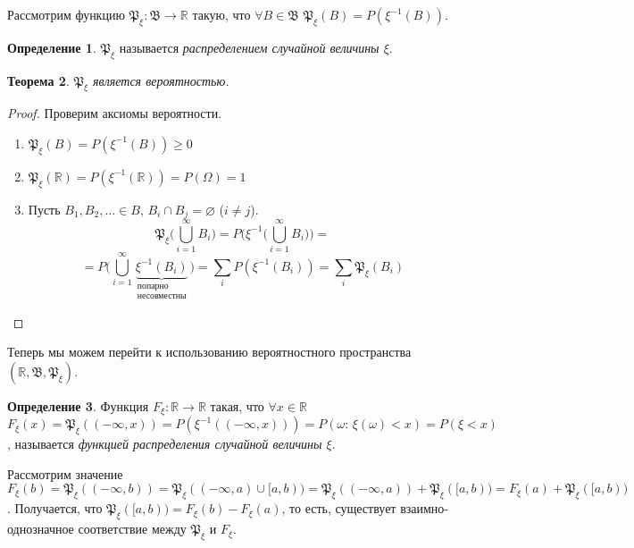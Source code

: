 \documentclass[11pt,openany,a4paper]{scrartcl}
\theoremstyle{plain}
\newtheorem{theorem}{Теорема}[subsection]
\theoremstyle{definition}
\newtheorem{definition}[theorem]{Определение}
\newcommand\mb{\mathbb}
\newcommand\real{\mb R}
\newcommand{\distr}{\mathfrak P_\xi}
\newcommand{\funcdistr}{F_\xi}
\begin{document}
Рассмотрим функцию $\mathfrak P_\xi: \mathfrak B \to \real$ такую, что
$\forall B \in \mathfrak B$ $\mathfrak P_\xi(B) = P(\xi^{-1}(B))$.

\begin{definition}
    $\mathfrak P_\xi$ называется \emph{распределением случайной величины $\xi$}.
\end{definition}
\begin{theorem}\label{distribution_is_probability}
    $\mathfrak P_\xi$ является вероятностью.
\end{theorem}
\begin{proof}
    Проверим аксиомы вероятности.
    \begin{enumerate}
        \item $\distr(B) = P(\xi^{-1}(B)) \geqslant 0$
        \item $\distr (\real) =P(\xi^{-1}(\real)) = P(\Omega) = 1$
        \item Пусть $B_1, B_2, \ldots \in B$, $B_i \cap B_j = \varnothing$
        ($i \neq j$).
        $$
        \distr \bigg(\bigcup\limits_{i=1}^\infty B_i\bigg) =
        P\bigg(\xi^{-1}\bigg(\bigcup\limits_{i=1}^\infty B_i\bigg)\bigg) =
        $$
        $$
        = P\bigg(\bigcup\limits_{i=1}^\infty \underbrace{\xi^{-1}
        (B_i)}_{\substack{\text{попарно}\\\text{несовместны}}}\bigg) =
        \sum\limits_i P(\xi^{-1}(B_i)) = \sum\limits_i \distr (B_i)
        $$
    \end{enumerate}
\end{proof}

Теперь мы можем перейти к использованию вероятностного пространства
$(\real, \mathfrak B, \distr)$.

\begin{definition}
    Функция $\funcdistr: \real \to \real$ такая, что
    $\forall x\in \real$ $\funcdistr(x) = \distr((-\infty, x)) = 
    P(\xi^{-1}((-\infty, x))) = P(\omega:\, \xi(\omega) < x) = P(\xi < x)$,
    называется \emph{функцией распределения случайной величины $\xi$}.
\end{definition}

Рассмотрим значение $\funcdistr(b) = \distr((-\infty, b)) =
\distr((-\infty, a) \cup [a, b)) = \distr((-\infty,a)) + \distr([a, b)) =
\funcdistr(a) + \distr([a, b))$. Получается, что
$\distr([a, b)) = \funcdistr(b) - \funcdistr(a)$, то есть,
существует взаимно-однозначное соответствие между $\distr$ и $\funcdistr$.
\end{document}
